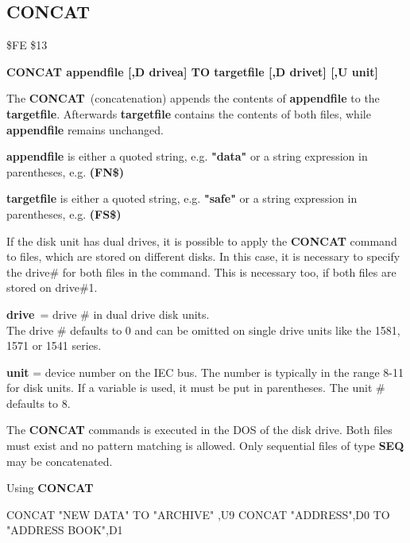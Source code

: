 \subsection{CONCAT}
\begin{description}[leftmargin=3cm,style=nextline]
\item [Token:] \$FE \$13
\item [Format:] {\bf CONCAT appendfile [,D drivea] TO
                targetfile [,D drivet] [,U unit] }
\item [Usage:]
   The {\bf CONCAT} (concatenation) appends the contents of
   {\bf appendfile} to the {\bf targetfile}. Afterwards {\bf targetfile}
   contains the contents of both files, while {\bf appendfile}
   remains unchanged.

   {\bf appendfile} is either a quoted string, e.g. {\bf "data"} or
   a string expression in parentheses, e.g. {\bf (FN\$)}

   {\bf targetfile} is either a quoted string, e.g. {\bf "safe"} or
   a string expression in parentheses, e.g. {\bf (FS\$)}

   If the disk unit has dual drives, it is possible to apply
   the {\bf CONCAT} command to files, which are stored on different
   disks. In this case, it is necessary to specify the drive\#
   for both files in the command. This is necessary too, if both
   files are stored on drive\#1.

   {\bf drive} = drive \# in dual drive disk units. \\
   The drive \# defaults to 0 and can be omitted on single drive units
   like the 1581, 1571 or 1541 series.

   {\bf unit} = device number on the IEC bus.
   The number is typically in the range 8-11 for disk units.
   If a variable is used, it must be put in parentheses.
   The unit \# defaults to 8.

\item [Remarks:]
   The {\bf CONCAT} commands is executed in the DOS of the disk drive.
   Both files must exist and no pattern matching is allowed.
   Only sequential files of type {\bf SEQ} may be concatenated.

\item [Example:] Using {\bf CONCAT}
\begin{screenoutput}
  CONCAT "NEW DATA" TO "ARCHIVE" ,U9
  CONCAT "ADDRESS",D0 TO "ADDRESS BOOK",D1
\end{screenoutput}
\end{description}

